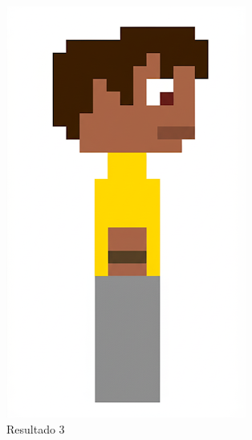 \begin{figure}[htbp]
\begin{subfigure}{0.23\linewidth}
        \includegraphics[width=1\linewidth]{figs/geminiPro/chat6/tela2_res3.png}
        \caption{\small Resultado 3}
        \label{fig:geminiPro18c}
    \end{subfigure}
    \begin{subfigure}{0.23\linewidth}

\end{subfigure}
\end{figure}
